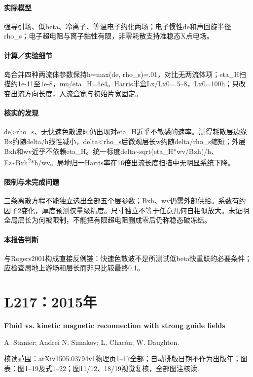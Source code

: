 \paragraph{实际模型}强导引场、低beta、冷离子、等温电子约化两场；电子惯性de和声回旋半径rho\_s；电子超电阻与离子黏性有限，非零耗散支持准稳态X点电场。

\paragraph{计算／实验细节}岛合并四种两流体参数保持h=max(de, rho\_s)=.01，对比无两流体项；eta\_H扫描约1e-11至1e-8，mu/eta\_H=1e4。Harris半盒Lx/Lx0=.5–8，Lx0=100h；只改变出流方向长度，入流盒宽与初始片宽固定。

\paragraph{核实的发现}de>rho\_s、无快速色散波时仍出现对eta\_H近乎不敏感的速率。测得耗散层边缘Bx约随delta/h线性减小，delta<rho\_s后微观层长w约随delta/rho\_s缩短；外层Bxh和wv近乎不依赖eta\_H。统一标度delta\textasciitilde{}sqrt(eta\_H*wv/Bxh)/h、Ez\textasciitilde{}Bxh\textsuperscript{2}*h/wv。局地归一Harris率在16倍出流长度扫描中无明显系统下降。

\paragraph{限制与未完成问题}三条离散方程不能独立选出全部五个层参数；Bxh、wv仍需外部供给。系数有约因子2变化，厚度预测仅量级精度。尺寸独立不等于任意几何自相似放大。未证明全局层长为何被限制，不能把有限超电阻删成零后仍称稳态破冻结。

\paragraph{本报告判断}与Rogers2001构成直接反例链：快速色散波不是所测试低beta快重联的必要条件；应检查局地上游场和层长而非只比较最终0.1。

\section{L217：2015年}\label{paper:L217}

\textbf{Fluid vs. kinetic magnetic reconnection with strong guide fields}\citep{L217}\

A. Stanier;  Andrei N. Simakov;  L. Chacón;  W. Daughton.

\textsf{核读范围：}arXiv1505.03794v1物理页1–17全部；自动排版日期不作为出版年；\textsf{图表：}图1–19及式1–22；图11/12、18/19视觉复核，全部图注核读.

